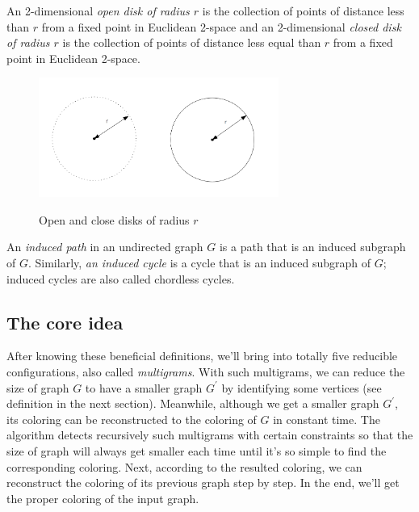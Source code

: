 \begin{definition}
An 2-dimensional \textit{open disk of radius $r$} is the collection of points of distance less than $r$ from a fixed point in Euclidean 2-space and an 2-dimensional \textit{closed disk of radius $r$} is the collection of points of distance less equal than $r$ from a fixed point in Euclidean 2-space. \cite{Open_disk}

\begin{figure}[H] %
\centering %
\includegraphics[width=0.7\textwidth]{figure/closeddisk.png} 
\label{figure} %
\caption{Open and close disks of radius $r$}
\end{figure}
\end{definition}

\begin{definition}
An \textit{induced path} in an undirected graph $G$ is a path that is an induced subgraph of $G$. Similarly, \textit{an induced cycle} is a cycle that is an induced subgraph of $G$; induced cycles are also called chordless cycles. \cite{Induced_path}
\end{definition}

\subsection{The core idea}
After knowing these beneficial definitions, we'll bring into totally five reducible configurations, also called \textit{multigrams}. With such multigrams, we can reduce the size of graph $G$ to have a smaller graph $G^{'}$ by identifying some vertices (see definition in the next section). Meanwhile, although we get a smaller graph $G^{'}$, its coloring can be reconstructed to the coloring of $G$ in constant time. The algorithm detects recursively such multigrams with certain constraints so that the size of graph will always get smaller each time until it's so simple to find the corresponding coloring. Next, according to the resulted coloring, we can reconstruct the coloring of its previous graph step by step. In the end, we'll get the proper coloring of the input graph. 

